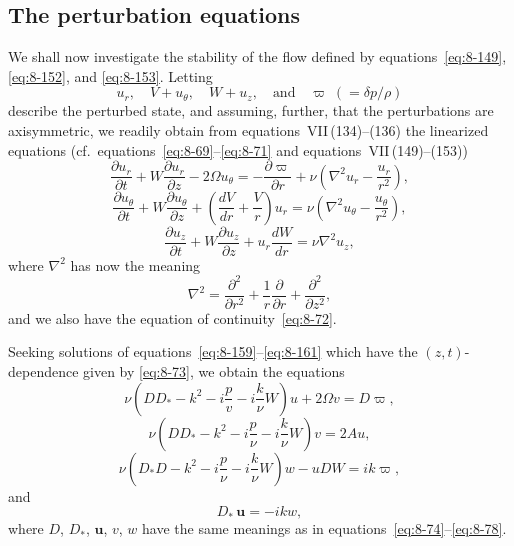 \subsection{The perturbation equations}
\label{sec:79a}

We shall now investigate the stability of the flow defined by equations~\eqref{eq:8-149}, \eqref{eq:8-152}, and \eqref{eq:8-153}. Letting
\begin{equation}
\label{eq:8-158}
u_r,\quad V + u_\theta,\quad W + u_z, \quad \text{and}\quad \varpi\;(= \delta p/\rho)
\end{equation}
describe the perturbed state, and assuming, further, that the perturbations are axisymmetric, we readily obtain from equations~VII\,(134)--(136) the linearized equations (cf.\ equations~\eqref{eq:8-69}--\eqref{eq:8-71} and equations~VII\,(149)--(153))
\begin{equation}
\label{eq:8-159}
\frac{\partial u_r}{\partial t} + W\frac{\partial u_r}{\partial z} - 2\Omega u_\theta = -\frac{\partial\varpi}{\partial r} + \nu\!\left(\nabla^2 u_r - \frac{u_r}{r^2}\right),
\end{equation}
\begin{equation}
\label{eq:8-160}
\frac{\partial u_\theta}{\partial t} + W\frac{\partial u_\theta}{\partial z} + \left(\frac{dV}{dr} + \frac{V}{r}\right)u_r = \nu\!\left(\nabla^2 u_\theta - \frac{u_\theta}{r^2}\right),
\end{equation}
\begin{equation}
\label{eq:8-161}
\frac{\partial u_z}{\partial t} + W\frac{\partial u_z}{\partial z} + u_r\frac{dW}{dr} = \nu\nabla^2 u_z,
\end{equation}
where $\nabla^2$ has now the meaning
\begin{equation}
\label{eq:8-162}
\nabla^2 = \frac{\partial^2}{\partial r^2} + \frac{1}{r}\frac{\partial}{\partial r} + \frac{\partial^2}{\partial z^2},
\end{equation}
and we also have the equation of continuity~\eqref{eq:8-72}.

Seeking solutions of equations~\eqref{eq:8-159}--\eqref{eq:8-161} which have the $(z,t)$-dependence given by \eqref{eq:8-73}, we obtain the equations
\begin{equation}
\label{eq:8-163}
\nu\!\left(DD_* - k^2 - i\frac{p}{v} - i\frac{k}{\nu}W\right)u + 2\Omega v = D\varpi,
\end{equation}
\begin{equation}
\label{eq:8-164}
\nu\!\left(DD_* - k^2 - i\frac{p}{\nu} - i\frac{k}{\nu}W\right)v = 2Au,
\end{equation}
\begin{equation}
\label{eq:8-165}
\nu\!\left(D_*D - k^2 - i\frac{p}{\nu} - i\frac{k}{\nu}W\right)w - uDW = ik\varpi,
\end{equation}
and
\begin{equation}
\label{eq:8-166}
D_*\,\mathbf{u} = -ikw,
\end{equation}
where $D$, $D_*$, $\mathbf{u}$, $v$, $w$ have the same meanings as in equations~\eqref{eq:8-74}--\eqref{eq:8-78}.


